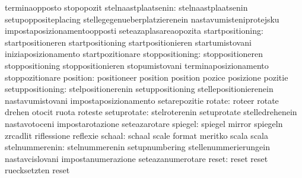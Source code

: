                                   terminaopposto                   stopopozit
             stelnaastplaatsenin: stelnaastplaatsenin              setupoppositeplacing
                                  stellegegenueberplatzierenein    nastavumisteniprotejsku
                                  impostaposizionamentoopposti     seteazaplasareaopozita
                startpositioning: startpositioneren                startpositioning
                                  startpositionieren               startumistovani
                                  iniziaposizionamento             startpozitionare
                 stoppositioning: stoppositioneren                 stoppositioning
                                  stoppositionieren                stopumistovani
                                  terminaposizionamento            stoppozitionare
                        position: positioneer                      position
                                  position                         pozice
                                  posizione                        pozitie
                setuppositioning: stelpositionerenin               setuppositioning
                                  stellepositionierenein           nastavumistovani
                                  impostaposizionamento            setarepozitie
                          rotate: roteer                           rotate
                                  drehen                           otocit
                                  ruota                            roteste %
                     setuprotate: stelroterenin                    setuprotate
                                  stelledrehenein                  nastavotoceni
                                  impostarotazione                 seteazarotare
                         spiegel: spiegel                          mirror
                                  spiegeln                         zrcadlit
                                  riflessione                      reflexie
                          schaal: schaal                           scale
                                  format                           meritko
                                  scala                            scala %
                  stelnummerenin: stelnummerenin                   setupnumbering
                                  stellenummerierungein            nastavcislovani
                                  impostanumerazione               seteazanumerotare
                           reset: reset                            reset
                                  ruecksetzten                     reset
